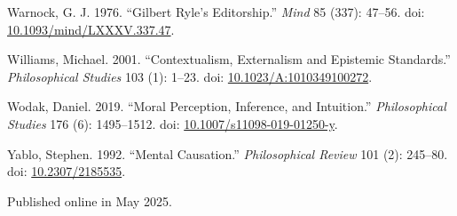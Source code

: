 \documentclass[
  11pt,
  letterpaper,
  DIV=11,
  numbers=noendperiod,
  twoside]{scrartcl}
\newlength{\cslhangindent}
\newenvironment{CSLReferences}[2] %
 {\begin{list}{}{%
  \setlength{\itemindent}{0pt}
  \setlength{\leftmargin}{0pt}
  \setlength{\parsep}{0pt}
  \ifodd #1
   \setlength{\leftmargin}{\cslhangindent}
   \setlength{\itemindent}{-1\cslhangindent}
  \fi
  \setlength{\itemsep}{#2\baselineskip}}}
 {\end{list}}
\begin{document}
\begin{CSLReferences}{1}{0}
Warnock, G. J. 1976. {``Gilbert Ryle's Editorship.''} \emph{Mind} 85
(337): 47--56. doi:
\href{https://doi.org/10.1093/mind/LXXXV.337.47}{10.1093/mind/LXXXV.337.47}.

Williams, Michael. 2001. {``Contextualism, Externalism and Epistemic
Standards.''} \emph{Philosophical Studies} 103 (1): 1--23. doi:
\href{https://doi.org/10.1023/A:1010349100272}{10.1023/A:1010349100272}.

Wodak, Daniel. 2019. {``Moral Perception, Inference, and Intuition.''}
\emph{Philosophical Studies} 176 (6): 1495--1512. doi:
\href{https://doi.org/10.1007/s11098-019-01250-y}{10.1007/s11098-019-01250-y}.

Yablo, Stephen. 1992. {``Mental Causation.''} \emph{Philosophical
Review} 101 (2): 245--80. doi:
\href{https://doi.org/10.2307/2185535}{10.2307/2185535}.

\end{CSLReferences}



\noindent Published online in May 2025.
\end{document}
